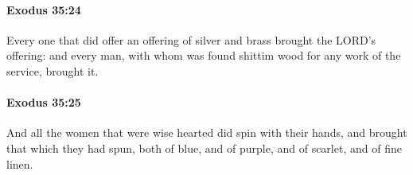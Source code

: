 		\paragraph{Exodus 35:24} %
			\label{EXODUS-35-24}

			Every one that did offer an offering of silver and brass brought the LORD's offering: and every man, with whom was found shittim wood for any work of the service, brought it.


		\paragraph{Exodus 35:25} %
			\label{EXODUS-35-25}

			And all the women that were wise hearted did spin with their hands, and brought that which they had spun, both of blue, and of purple, and of scarlet, and of fine linen.


